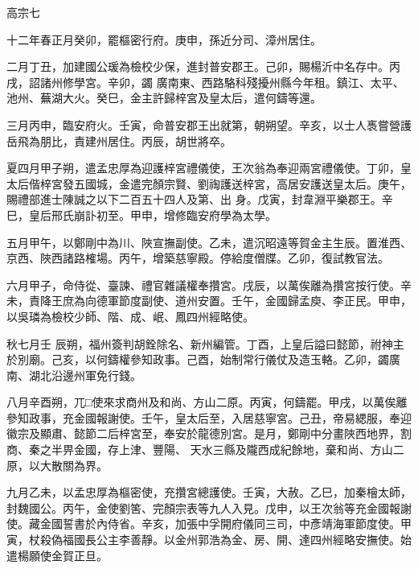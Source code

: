 
\begin{pinyinscope}

 高宗七



 十二年春正月癸卯，罷樞密行府。庚申，孫近分司、漳州居住。



 二月丁丑，加建國公瑗為檢校少保，進封普安郡王。己卯，賜楊沂中名存中。丙戌，詔諸州修學宮。辛卯，蠲
 廣南東、西路駱科殘擾州縣今年租。鎮江、太平、池州、蕪湖大火。癸巳，金主許歸梓宮及皇太后，遣何鑄等還。



 三月丙申，臨安府火。壬寅，命普安郡王出就第，朝朔望。辛亥，以士人褭嘗營護岳飛為朋比，責建州居住。丙辰，胡世將卒。



 夏四月甲子朔，遣孟忠厚為迎護梓宮禮儀使，王次翁為奉迎兩宮禮儀使。丁卯，皇太后偕梓宮發五國城，金遣完顏宗賢、劉祹護送梓宮，高居安護送皇太后。庚午，賜禮部進士陳誠之以下二百五十四人及第、出
 身。戊寅，封韋淵平樂郡王。辛巳，皇后邢氏崩訃初至。甲申，增修臨安府學為太學。



 五月甲午，以鄭剛中為川、陜宣撫副使。乙未，遣沉昭遠等賀金主生辰。置淮西、京西、陜西諸路榷場。丙午，增築慈寧殿。停給度僧牒。乙卯，復試教官法。



 六月甲子，命侍從、臺諫、禮官雜議權奉攢宮。戌辰，以萬俟離為攢宮按行使。辛未，責降王庶為向德軍節度副使、道州安置。壬午，金國歸孟庾、李正民。甲申，以吳璘為檢校少師、階、成、岷、鳳四州經略使。



 秋七月壬
 辰朔，福州簽判胡銓除名、新州編管。丁酉，上皇后謚曰懿節，祔神主於別廟。己亥，以何鑄權參知政事。己酉，始制常行儀仗及造玉輅。乙卯，蠲廣南、湖北沿邊州軍免行錢。



 八月辛酉朔，兀□使來求商州及和尚、方山二原。丙寅，何鑄罷。甲戌，以萬俟離參知政事，充金國報謝使。壬午，皇太后至，入居慈寧宮。己丑，帝易緦服，奉迎徽宗及顯肅、懿節二后梓宮至，奉安於龍德別宮。是月，鄭剛中分畫陜西地界，割商、秦之半畀金國，存上津、豐陽、
 天水三縣及隴西成紀餘地，棄和尚、方山二原，以大散關為界。



 九月乙未，以孟忠厚為樞密使，充攢宮總護使。壬寅，大赦。乙巳，加秦檜太師，封魏國公。丙午，金使劉筈、完顏宗表等九人入見。戊申，以王次翁等充金國報謝使。藏金國誓書於內侍省。辛亥，加張中孚開府儀同三司，中彥靖海軍節度使。甲寅，杖殺偽福國長公主李善靜。以金州郭浩為金、房、開、達四州經略安撫使。始遣楊願使金賀正旦。




\end{pinyinscope}

